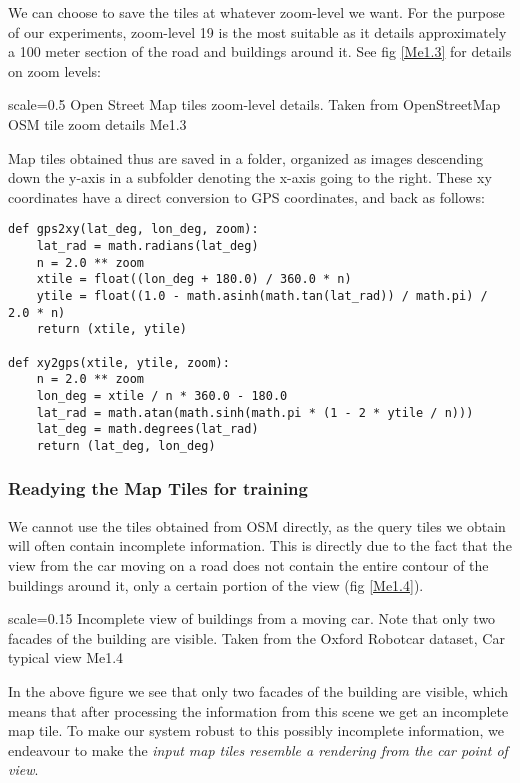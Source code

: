 We can choose to save the tiles at whatever zoom-level we want. For the purpose of our experiments, zoom-level 19 is the most suitable as it details approximately a 100 meter section of the road and buildings around it. See fig \ref{Me1.3} for details on zoom levels:

{scale=0.5}%
{Open Street Map tiles zoom-level details. Taken from OpenStreetMap}%
{OSM tile zoom details}%
{Me1.3}

Map tiles obtained thus are saved in a folder, organized as images descending down the y-axis in a subfolder denoting the x-axis going to the right. These xy coordinates have a direct conversion to GPS coordinates, and back as follows:

\begin{verbatim}
def gps2xy(lat_deg, lon_deg, zoom):
    lat_rad = math.radians(lat_deg)
    n = 2.0 ** zoom
    xtile = float((lon_deg + 180.0) / 360.0 * n)
    ytile = float((1.0 - math.asinh(math.tan(lat_rad)) / math.pi) / 2.0 * n)
    return (xtile, ytile)

def xy2gps(xtile, ytile, zoom):
    n = 2.0 ** zoom
    lon_deg = xtile / n * 360.0 - 180.0
    lat_rad = math.atan(math.sinh(math.pi * (1 - 2 * ytile / n)))
    lat_deg = math.degrees(lat_rad)
    return (lat_deg, lon_deg)
\end{verbatim}

\subsubsection{Readying the Map Tiles for training}
We cannot use the tiles obtained from OSM directly, as the query tiles we obtain will often contain incomplete information. This is directly due to the fact that the view from the car moving on a road does not contain the entire contour of the buildings around it, only a certain portion of the view (fig \ref{Me1.4}). 

{scale=0.15}%
{Incomplete view of buildings from a moving car. Note that only two facades of the building are visible. Taken from the Oxford Robotcar dataset,  \cite{newman2017}}%
{Car typical view}%
{Me1.4}

In the above figure we see that only two facades of the building are visible, which means that after processing the information from this scene we get an incomplete map tile. To make our system robust to this possibly incomplete information, we endeavour to make the  \textit{input map tiles resemble a rendering from the car point of view}.

